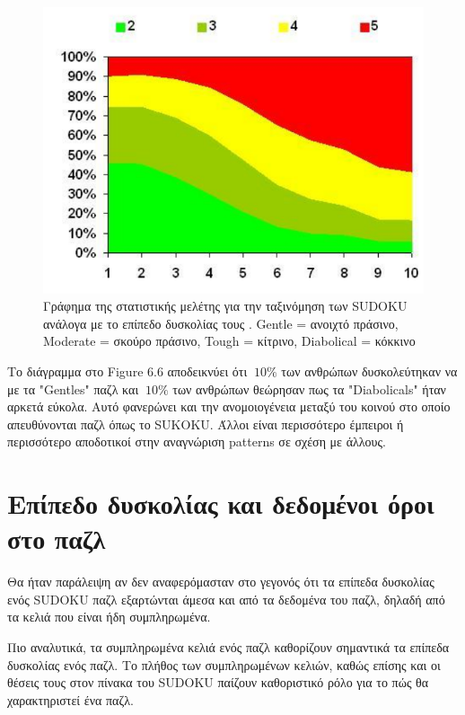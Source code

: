 \documentclass[12pt]{book}
\theoremstyle{definition}
\begin{document}
\begin{figure}[h]
	\centering
	\includegraphics[scale=0.55]{Figures/stat3.png}
	\caption{Γράφημα της στατιστικής μελέτης για την ταξινόμηση των SUDOKU ανάλογα με το επίπεδο δυσκολίας τους . Gentle = ανοιχτό πράσινο, Moderate = σκούρο πράσινο, Tough = κίτρινο, Diabolical = κόκκινο}
\end{figure}

Το διάγραμμα στο Figure 6.6 αποδεικνύει ότι \(~10\%\) των ανθρώπων δυσκολεύτηκαν να με τα "Gentles" παζλ και \(~10\%\) των ανθρώπων θεώρησαν πως τα "Diabolicals" ήταν αρκετά εύκολα. Αυτό φανερώνει και την ανομοιογένεια μεταξύ του κοινού στο οποίο απευθύνονται παζλ όπως το SUKOKU. Άλλοι είναι περισσότερο έμπειροι ή περισσότερο αποδοτικοί στην αναγνώριση patterns σε σχέση με άλλους.

\section{Επίπεδο δυσκολίας και δεδομένοι όροι στο παζλ}

Θα ήταν παράλειψη αν δεν αναφερόμασταν στο γεγονός ότι τα επίπεδα δυσκολίας ενός SUDOKU παζλ εξαρτώνται άμεσα και από τα δεδομένα του παζλ, δηλαδή από τα κελιά που είναι ήδη συμπληρωμένα. \par

Πιο αναλυτικά, τα συμπληρωμένα κελιά ενός παζλ καθορίζουν σημαντικά τα επίπεδα δυσκολίας ενός παζλ. Το πλήθος των συμπληρωμένων κελιών, καθώς επίσης και οι θέσεις τους στον πίνακα του SUDOKU παίζουν καθοριστικό ρόλο για το πώς θα χαρακτηριστεί ένα παζλ. \par
\end{document}
